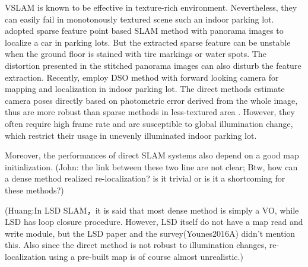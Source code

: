 \documentclass[journal]{IEEEtran}
\begin{document}
%

VSLAM is known to be effective in texture-rich environment\citep{ORB}.
Nevertheless, they can easily fail in monotonously textured scene such an indoor parking lot.
\citet{VW paking} adopted sparse feature point based SLAM method with panorama images to localize a car in parking lots.
But the extracted sparse feature can be unstable when the ground floor is stained with tire markings or water spots.
The distortion presented in the stitched panorama images can also disturb the feature extraction.
Recently, \citet{Horizon DSO} employ DSO method with forward looking camera for mapping and localization in indoor parking lot.
The direct methods estimate camera poses directly based on photometric error derived from the whole image, thus are more robust than sparse methods in less-textured area \citep{Engel2014LSD} \citep{Forster2013SVO}.
However, they often require high frame rate and are susceptible to global illumination change, which restrict their usage in unevenly illuminated indoor parking lot\citep{Younes2016A}. 

Moreover, the performances of direct SLAM systems also depend on a good map initialization.\citep{Younes2016A}\citep{Horizon DSO}
(John: the link between these two line are not clear; Btw, how can a dense method realized re-localization? is it trivial or is it a shortcoming for these methods?)

(Huang:In LSD SLAM，it is said that most dense method is simply a VO, while LSD has loop closure procedure. 
However, LSD itself do not have a map read and write module, but the LSD paper and the survey(Younes2016A) didn't mention this. Also since the direct method is not robust to illumination changes, re-localization using a pre-built map is of course almost unrealistic.)
\end{document}
